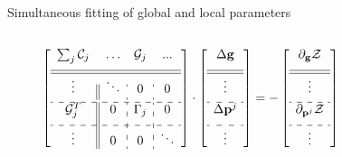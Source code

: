 \documentclass[compress, 13pt, aspectratio=169]{beamer}
\begin{document}
\begin{frame}[t,fragile]{Simultaneous fitting of global and local parameters}
\begin{columns}[t]
\begin{column}{0.45\textwidth}
			\vspace*{-0.9em}
			\setlength\extrarowheight{6pt}
			\scriptsize{
				$$ \left[  \begin{array}{c||c:c:c}
							\sum_j \mathcal{C}_j & \ldots & \mathcal{G}_j & ...    \\[6pt] \hline\hline
							\vdots               & \ddots & 0             & 0      \\[4pt] \hdashline
							\mathcal{G}^T_j      & 0      & \Gamma_j      & 0      \\[6pt] \hdashline
							\vdots               & 0      & 0             & \ddots \\
						\end{array}  \right] \cdot
					\left[ \begin{array}{c}
							\Delta \mathbf{g}   \\[6pt] \hline\hline
							\vdots              \\[4pt] \hdashline
							\Delta \mathbf{p}^j \\[6pt] \hdashline
							\vdots              \\
						\end{array} \right] =
					-\left[ \begin{array}{c}
							\partial_\mathbf{g} \mathcal{Z}     \\[6pt] \hline\hline
							\vdots                              \\[4pt] \hdashline
							\partial_{\mathbf{p}^j} \mathcal{Z} \\[6pt] \hdashline
							\vdots                              \\
						\end{array} \right]
				$$
			}

		\end{column}
		\begin{column}[t]{0.45\textwidth}
			\vspace*{-1em}


\end{column}
\end{columns}
\end{frame}
\end{document}
